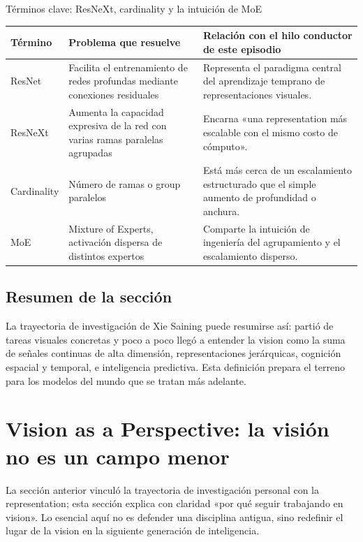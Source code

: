 \documentclass[a4paper]{article}
\begin{document}
\begin{knowledgebox}{Términos clave: ResNeXt, cardinality y la intuición de MoE}
\begin{tabularx}{\textwidth}{p{}p{}X}
\toprule
Término & Problema que resuelve & Relación con el hilo conductor de este episodio \\
\midrule
ResNet & Facilita el entrenamiento de redes profundas mediante conexiones residuales & Representa el paradigma central del aprendizaje temprano de representaciones visuales. \\
ResNeXt & Aumenta la capacidad expresiva de la red con varias ramas paralelas agrupadas & Encarna «una representation más escalable con el mismo costo de cómputo». \\
Cardinality & Número de ramas o group paralelos & Está más cerca de un escalamiento estructurado que el simple aumento de profundidad o anchura. \\
MoE & Mixture of Experts, activación dispersa de distintos expertos & Comparte la intuición de ingeniería del agrupamiento y el escalamiento disperso. \\
\bottomrule
\end{tabularx}
\end{knowledgebox}

\subsection{Resumen de la sección}

La trayectoria de investigación de Xie Saining puede resumirse así: partió de tareas visuales concretas y poco a poco llegó a entender la vision como la suma de señales continuas de alta dimensión, representaciones jerárquicas, cognición espacial y temporal, e inteligencia predictiva. Esta definición prepara el terreno para los modelos del mundo que se tratan más adelante.

\section{Vision as a Perspective: la visión no es un campo menor}

La sección anterior vinculó la trayectoria de investigación personal con la representation; esta sección explica con claridad «por qué seguir trabajando en vision». Lo esencial aquí no es defender una disciplina antigua, sino redefinir el lugar de la vision en la siguiente generación de inteligencia.
\end{document}
